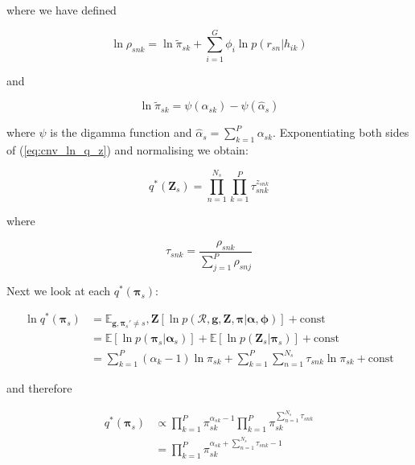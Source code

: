 \documentclass{article}
\begin{document}
where we have defined

\begin{equation}
\label{eq:cnv_ln_rho}
\ln \rho_{snk} = \ln \tilde{\pi}_{sk} + \sum_{i = 1}^G \phi_i \ln p(r_{sn} | h_{ik})
\end{equation}

and

\begin{equation}
\label{eq:cnv_ex_ln_pi}
\ln \tilde{\pi}_{sk} = \psi(\alpha_{sk}) - \psi(\hat{\alpha}_s)
\end{equation}

where $\psi$ is the digamma function and $\hat{\alpha}_{s} = \sum_{k = 1}^P \alpha_{sk}$. Exponentiating both sides of (\ref{eq:cnv_ln_q_z}) and normalising we obtain:

\begin{equation}
\label{eq:cnv_q_z}
q^*(\boldsymbol{Z}_s) = \prod_{n = 1}^{N_s} \prod_{k = 1}^P \tau_{snk}^{z_{snk}}
\end{equation}

where

\begin{equation}
\label{eq:cnv_tau}
\tau_{snk} = \frac{\rho_{snk}}{\sum_{j = 1}^P \rho_{snj}}
\end{equation}

Next we look at each $q^*(\boldsymbol{\pi}_s)$:

\begin{align}
\label{eq:cnv_ln_q_pi}
\ln q^*(\boldsymbol{\pi}_s) &= \mathbb{E}_{\boldsymbol{g}, \boldsymbol{\pi}_s' \ne s}, \boldsymbol{Z} [\ln p(\mathcal{R}, \boldsymbol{g}, \boldsymbol{Z}, \boldsymbol{\pi} | \boldsymbol{\alpha}, \boldsymbol{\phi})] + \text{const} \\
&= \mathbb{E}[\ln p(\boldsymbol{\pi}_s | \boldsymbol{\alpha}_s)] + \mathbb{E}[\ln p(\boldsymbol{Z}_s | \boldsymbol{\pi}_s)] + \text{const} \\
&= \sum_{k = 1}^P (\alpha_k - 1) \ln \pi_{sk} + \sum_{k = 1}^P \sum_{n = 1}^{N_s} \tau_{snk} \ln \pi_{sk} + \text{const}
\end{align}

and therefore

\begin{align}
\label{eq:cnv_q_pi}
q^*(\boldsymbol{\pi}_s) &\propto \prod_{k = 1}^P \pi_{sk}^{\alpha_{sk} - 1} \prod_{k = 1}^P \pi_{sk}^{\sum_{n = 1}^{N_s} \tau_{snk}} \\
&=  \prod_{k = 1}^P \pi_{sk}^{\alpha_{sk} + \sum_{n = 1}^{N_s} \tau_{snk} - 1}
\end{align}
\end{document}
